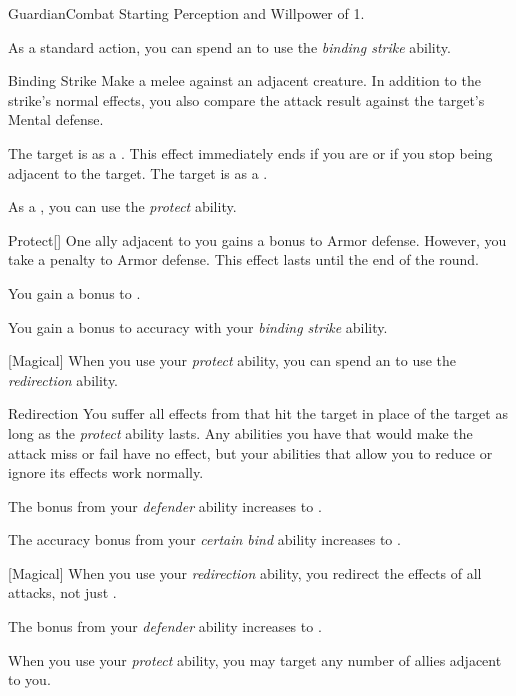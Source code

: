     \begin{feat}{Guardian}{Combat}
        \featpre Starting Perception and Willpower of 1.

         As a standard action, you can spend an  to use the \textit{binding strike} ability.
        \begin{ability}{Binding Strike}
            Make a melee  against an adjacent creature.
            In addition to the strike's normal effects, you also compare the attack result against the target's Mental defense.

            \hit The target is  as a .
            This effect immediately ends if you are  or if you stop being adjacent to the target.
            \crit The target is  as a .
        \end{ability}

         As a , you can use the \textit{protect} ability.
        \begin{ability}{Protect}[]
            One ally adjacent to you gains a  bonus to Armor defense.
            However, you take a  penalty to Armor defense.
            This effect lasts until the end of the round.
        \end{ability}

         You gain a  bonus to .

         You gain a  bonus to accuracy with your \textit{binding strike} ability.

        [Magical] When you use your \textit{protect} ability, you can spend an  to use the \textit{redirection} ability.
        \begin{ability}{Redirection}
            You suffer all effects from  that hit the target in place of the target as long as the \textit{protect} ability lasts.
            Any abilities you have that would make the attack miss or fail have no effect, but your abilities that allow you to reduce or ignore its effects work normally.
        \end{ability}

         The bonus from your \textit{defender} ability increases to .

         The accuracy bonus from your \textit{certain bind} ability increases to .

        [Magical] When you use your \textit{redirection} ability, you redirect the effects of all attacks, not just .

         The bonus from your \textit{defender} ability increases to .

         When you use your \textit{protect} ability, you may target any number of allies adjacent to you.
    \end{feat}


